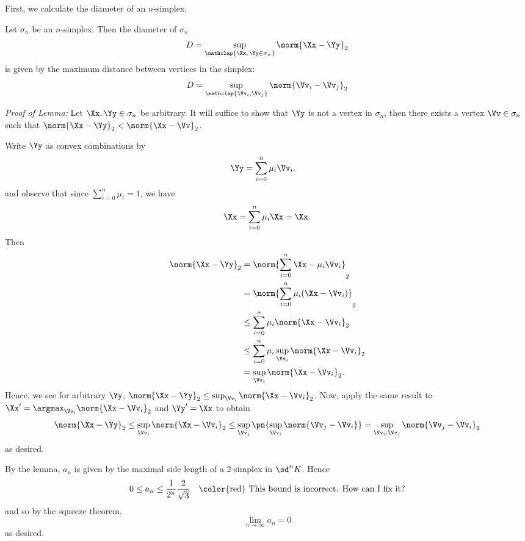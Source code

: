 \begin{solution}
  First, we calculate the diameter of an $n$-simplex.
  \begin{leftbar}
    \begin{lemma}
      Let $\sigma_n$ be an $n$-simplex. Then the diameter of $\sigma_n$
      \[
        D = \sup_{\mathclap{\Xx,\, \Yy \in \sigma_n}} \norm{\Xx - \Yy}_2
      \]
      is given by the maximum distance between vertices in the simplex:
      \[
        D = \sup_{\mathclap{\Vv_i, \Vv_j}} \norm{\Vv_i - \Vv_j}_2
      \]
    \end{lemma}

    \emph{Proof of Lemma:} Let $\Xx, \Yy \in \sigma_n$ be arbitrary. It will
    suffice to show that $\Yy$ is not a vertex in $\sigma_n$, then there exists
    a vertex $\Vv \in \sigma_n$ such that $\norm{\Xx - \Yy}_2 < \norm{\Xx -
      \Vv}_2$.

    Write $\Yy$ as convex combinations by
    \begin{align*}
      \Yy &= \sum_{i=0}^n \mu_i \Vv_i.
    \end{align*}
    and observe that since $\sum_{i=0}^n \mu_i = 1$, we have
    \[
      \Xx = \sum_{i=0}^n \mu_i \Xx = \Xx.
    \]
    Then
    \begin{align*}
      \norm{\Xx - \Yy}_2
      &= \norm{\sum_{i=0}^n \Xx - \mu_i\Vv_i}_2 \\
      &= \norm{\sum_{i=0}^n \mu_i(\Xx - \Vv_i)}_2 \\
      &\leq \sum_{i=0}^n \mu_i \norm{\Xx - \Vv_i}_2 \\
      &\leq \sum_{i=0}^n \mu_i \sup_{\Vv_i} \norm{\Xx - \Vv_i}_2 \\
      &= \sup_{\Vv_i} \norm{\Xx - \Vv_i}_2.
    \end{align*}
    Hence, we see for arbitrary $\Yy$, $\norm{\Xx - \Yy}_2 \leq \sup_{\Vv_i}
    \norm{\Xx - \Vv_i}_2$. Now, apply the same result to $\Xx' = \argmax_{\Vv_i}
    \norm{\Xx - \Vv_i}_2$ and $\Yy' = \Xx$ to obtain
    \[
      \norm{\Xx - \Yy}_2 \leq \sup_{\Vv_i} \norm{\Xx - \Vv_i}_2 \leq
      \sup_{\Vv_j}\pn{ \sup_{\Vv_i} \norm{\Vv_j - \Vv_i}} = \sup_{\Vv_i, \Vv_j}
      \norm{\Vv_j - \Vv_i}_2
    \]
    as desired.
  \end{leftbar}
  By the lemma, $a_n$ is given by the maximal side length of a 2-simplex in
  $\sd^n K$. Hence
  \[
    0 \leq a_n \leq \frac{1}{2^n} \frac{2}{\sqrt{3}} \quad \text{\color{red}
      This bound is incorrect. How can I fix it?}
  \]
  and so by the squeeze theorem,
  \[
    \lim_{n\to\infty} a_n = 0
  \]
  as desired.
\end{solution}
